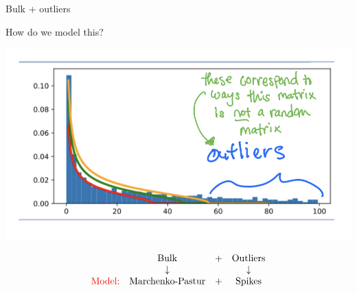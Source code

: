 \documentclass[10pt]{beamer}
\begin{document}
\begin{frame}{Bulk + outliers}
    \begin{center}
        How do we model this? 
    \end{center}
    \begin{center}
        \includegraphics[scale = 0.4]{part-2-images/MNIST_3_correct.png}
    \end{center}
    
    \[
    \begin{array}{cccc}
    & \text{Bulk} & + & \text{Outliers}\\
    & \downarrow & & \downarrow\\
    \text{\textcolor{red}{Model:}} & \text{Marchenko-Pastur} & + & \text{Spikes}
    \end{array}
    \]
    
\end{frame}
\end{document}
